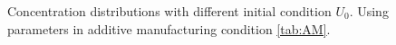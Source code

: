 \documentclass[final,times]{elsarticle}
\numberwithin{equation}{section}
\begin{document}
 \begin{figure}[!ht]
 \centering
     \hfill
     
     \caption{Concentration distributions with different initial condition $U_0$. Using parameters in additive manufacturing condition \ref{tab:AM}.}
     \label{fig:Ech}
   \end{figure}
   

   













\end{document}
